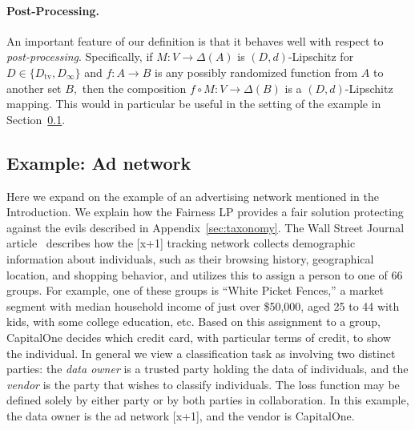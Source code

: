 \documentclass[letterpaper,11pt]{article}
\theoremstyle{definition}
\newcommand{\tv}{\mathrm{tv}}
\newcommand{\network}{data owner}
\begin{document}
\paragraph{Post-Processing.}
An important feature of our definition is that it behaves well with respect to
\emph{post-processing}. Specifically, if $M\colon V\to\Delta(A)$ is
$(D,d)$-Lipschitz for $D\in\{D_\tv,D_\infty\}$ and $f\colon A\to B$ is any
possibly randomized function from $A$ to another set $B,$ then the composition
$f\circ M\colon V\to\Delta(B)$ is a $(D,d)$-Lipschitz mapping. This would in particular be useful in the setting of
the example in Section~\ref{sec:adexample}.

\subsection{Example: Ad network}
\label{sec:adexample}

Here we expand on the example of an advertising network mentioned in
the Introduction.  We explain how the Fairness LP provides a fair
solution protecting against the evils described in
Appendix~\ref{sec:taxonomy}.  The Wall Street Journal
article~\cite{WSJ:8-4-10} describes how the [x+1] tracking network
collects demographic information about individuals, such as their
browsing history, geographical location, and shopping behavior, and
utilizes this to assign a person to one of 66 groups.  For example,
one of these groups is ``White Picket Fences,'' a market segment with
median household income of just over \$50,000, aged 25 to 44 with
kids, with some college education, etc.  Based on this assignment to a
group, CapitalOne decides which credit card, with particular terms of
credit, to show the individual.  In general we view a classification
task as involving two distinct parties: the {\it \network} is a
trusted party holding the data of individuals, and the {\it vendor} is
the party that wishes to classify individuals.  The loss function may
be defined solely by either party or by both parties in collaboration.
In this example, the data owner is the ad network [x+1], and the
vendor is CapitalOne.
\end{document}
